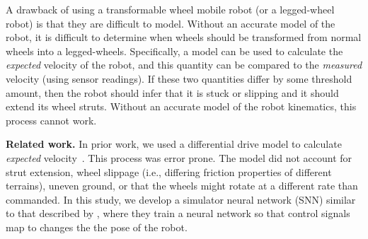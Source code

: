 A drawback of using a transformable wheel mobile robot (or a legged-wheel robot) is that they are difficult to model.
%
Without an accurate model of the robot, it is difficult to determine when wheels should be transformed from normal wheels into a legged-wheels.
%
Specifically, a model can be used to calculate the \emph{expected} velocity of the robot, and this quantity can be compared to the \emph{measured} velocity (using sensor readings). If these two quantities differ by some threshold amount, then the robot should infer that it is stuck or slipping and it should extend its wheel struts.
%
Without an accurate model of the robot kinematics, this process cannot work.


\noindent
\textbf{Related work.}
%
In prior work, we used a differential drive model to calculate \emph{expected} velocity~\citep{Clark.2018.C.EvolvingControllersTransformable}. This process was error prone.
%
The model did not account for strut extension, wheel slippage (i.e., differing friction properties of different terrains), uneven ground, or that the wheels might rotate at a different rate than commanded.
%
In this study, we develop a simulator neural network (SNN) similar to that described by \citet{Pretorius.2014.2ICECC.ComparisonNeuralNetworks}, where they train a neural network so that control signals map to changes the the pose of the robot.
